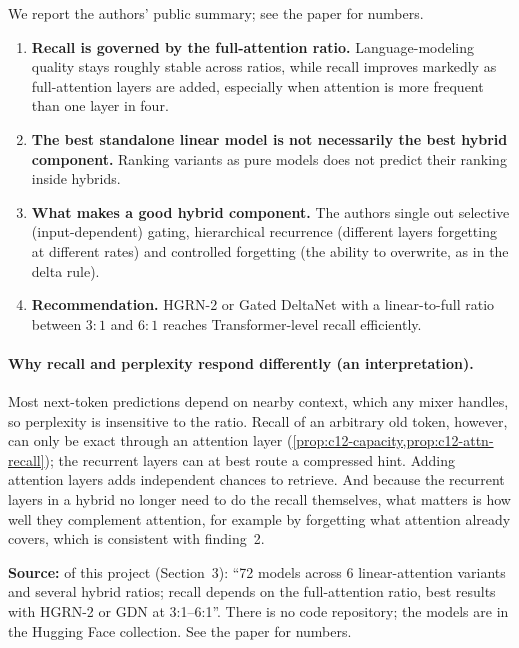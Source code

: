 We report the authors' public summary; see the paper for numbers.
\begin{enumerate}
  \item \textbf{Recall is governed by the full-attention ratio.} Language-modeling quality stays
  roughly stable across ratios, while recall improves markedly as full-attention layers are added,
  especially when attention is more frequent than one layer in four.
  \item \textbf{The best standalone linear model is not necessarily the best hybrid component.}
  Ranking variants as pure models does not predict their ranking inside hybrids.
  \item \textbf{What makes a good hybrid component.} The authors single out selective
  (input-dependent) gating, hierarchical recurrence (different layers forgetting at different
  rates) and controlled forgetting (the ability to overwrite, as in the delta rule).
  \item \textbf{Recommendation.} HGRN-2 or Gated DeltaNet with a linear-to-full ratio between
  $3{:}1$ and $6{:}1$ reaches Transformer-level recall efficiently.
\end{enumerate}

\paragraph{Why recall and perplexity respond differently (an interpretation).} Most next-token
predictions depend on nearby context, which any mixer handles, so perplexity is insensitive to
the ratio. Recall of an arbitrary old token, however, can only be exact through an attention
layer (\cref{prop:c12-capacity,prop:c12-attn-recall}); the recurrent layers can at best route a
compressed hint. Adding attention layers adds independent chances to retrieve. And because the
recurrent layers in a hybrid no longer need to do the recall themselves, what matters is how well
they complement attention, for example by forgetting what attention already covers, which is
consistent with finding~2.

\begin{results}
\textbf{Source:}  of this project (Section~3): ``72 models across 6
linear-attention variants and several hybrid ratios; recall depends on the full-attention ratio,
best results with HGRN-2 or GDN at 3:1--6:1''. There is no code repository; the models are in
the  Hugging Face collection. See the paper for numbers.
\end{results}


